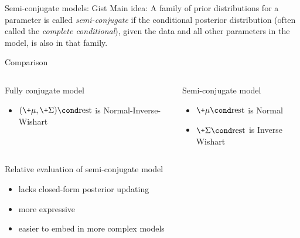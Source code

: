 \documentclass[10pt]{beamer}
\begin{document}
\begin{frame}{Semi-conjugate models: Gist}
\alert{Main idea:}  A family of prior distributions for a parameter is called \textit{semi-conjugate} if the conditional posterior distribution (often called the \textit{complete conditional}),  given the data and all other parameters in the model,  is also in that family.
\vfill

\begin{block}{Comparison}
\begin{columns}
    \begin{column}{.45\linewidth}
	Fully conjugate model 
	\begin{itemize}
	\item $(\+\mu, \+\Sigma) \cond \text{rest}$ is Normal-Inverse-Wishart
	\end{itemize}
	\end{column}
    \begin{column}{.45\linewidth}
	    Semi-conjugate model
	\begin{itemize}
	\item $\+\mu \cond \text{rest}$ is Normal
	\item $\+\Sigma \cond \text{rest}$ is Inverse Wishart	
	\end{itemize}
    \end{column}
\end{columns}
\end{block}

\vfill
\pause 
{}
\begin{block}{Relative evaluation of semi-conjugate model} \pause 
\begin{itemize}
\item[] \redx lacks closed-form posterior updating \pause 
\item[] \greencheck more expressive \pause 
\item[] \greencheck easier to embed in more complex models 
\end{itemize}
\end{block}
	
\end{frame}
\end{document}
